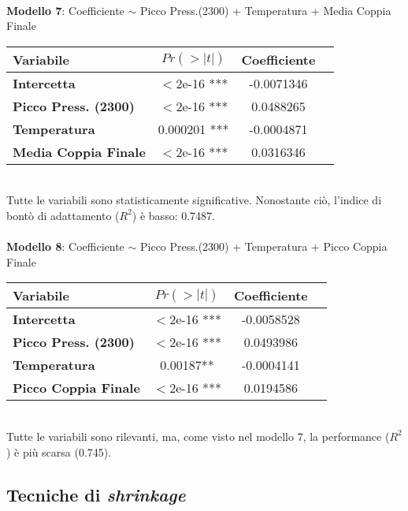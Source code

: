 \documentclass[fleqn,10pt]{SelfArx} %
\begin{document}
\\
\textbf{Modello 7}: Coefficiente $\sim$ Picco Press.(2300) + Temperatura + Media Coppia Finale
{\begin{table}[h] 
\centering
\begin{tabular}[t]{lccc}
\toprule 
Variabile&$Pr(> |t|)$&Coefficiente\\
\midrule 
\textbf{Intercetta}&$<$2e-16 ***&-0.0071346\\ 
\textbf{Picco Press. (2300)}&$<$2e-16 ***&0.0488265\\
\textbf{Temperatura}&0.000201 ***&-0.0004871\\
\textbf{Media Coppia Finale}&$<$2e-16 ***&0.0316346\\
\bottomrule 
\end{tabular}
\end{table}}\\
Tutte le variabili sono statisticamente significative. Nonostante ciò, l'indice di bontò di adattamento ($R^2$) è basso: 0.7487.\\
\\
\textbf{Modello 8}: Coefficiente $\sim$ Picco Press.(2300) + Temperatura + Picco Coppia Finale
{\begin{table}[h] 
\centering
\begin{tabular}[t]{lccc}
\toprule 
Variabile&$Pr(> |t|)$&Coefficiente\\
\midrule 
\textbf{Intercetta}&$<$2e-16 ***&-0.0058528\\ 
\textbf{Picco Press. (2300)}&$<$2e-16 ***&0.0493986\\
\textbf{Temperatura}&0.00187**&-0.0004141\\
\textbf{Picco Coppia Finale}&$<$2e-16 ***&0.0194586\\
\bottomrule 
\end{tabular}
\end{table}}\\
Tutte le variabili sono rilevanti, ma, come visto nel modello 7, la performance ($R^2$) è più scarsa (0.745).


\subsection{Tecniche di \textit{shrinkage}}
\end{document}
